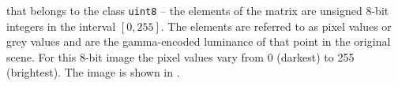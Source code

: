 that belongs to the class \lstinline{uint8} -- the elements of the matrix are
unsigned 8-bit integers in the interval $[0,255]$. The elements are referred to as pixel values or
grey values and are the gamma-encoded luminance of that
point in the original scene. For this 8-bit image the pixel values vary from 0 (darkest) to 255
(brightest). The image is shown in .
